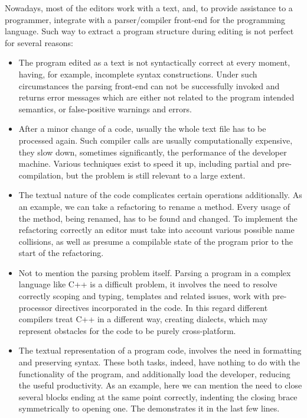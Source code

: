 Nowadays, most of the editors work with a text, and, to provide assistance to a programmer, integrate
with a parser/compiler front-end for the programming language. Such way to extract a program
structure during editing is not perfect for several reasons:

\begin{itemize}
 \item The program edited as a text is not syntactically correct at every moment, 
having, for example, incomplete syntax constructions. Under such circumstances the parsing front-end can not be
successfully invoked and returns error messages which are either not related to the program intended semantics, 
or false-positive warnings and errors. 
  
 \item After a minor change of a code, usually the whole text file has to be processed again. Such compiler calls are usually 
computationally expensive, they slow down, sometimes significantly, the performance of the developer machine. Various techniques exist to speed it up, including partial 
and pre- compilation, but the problem is still relevant to a large extent. 

\item The textual nature of the code complicates certain operations additionally. As an example, we can take a refactoring
to rename a method. Every usage of the method, being renamed, has to be found and changed. To implement the refactoring 
correctly an editor must take into account various possible name collisions, as well 
as presume a compilable state of the program prior to the start of the refactoring.

\item Not to mention the parsing problem itself. Parsing a program in a complex language like C++ is a difficult problem, it involves 
the need to resolve correctly scoping and typing, templates and related issues, work with pre-processor directives incorporated
in the code. In this regard different compilers treat C++ in a different way, creating dialects, which may represent obstacles for
the code to be purely cross-platform.


\item The textual representation of a program code, involves the need in formatting and preserving syntax.
These both tasks, indeed,  have nothing to do with the functionality of the program, and additionally 
load the developer, reducing the useful productivity. As an example, here we can mention the need to close
several blocks ending at the same point correctly, indenting the closing brace symmetrically 
to opening one. The  demonstrates it in the last few lines.


\end{itemize}

